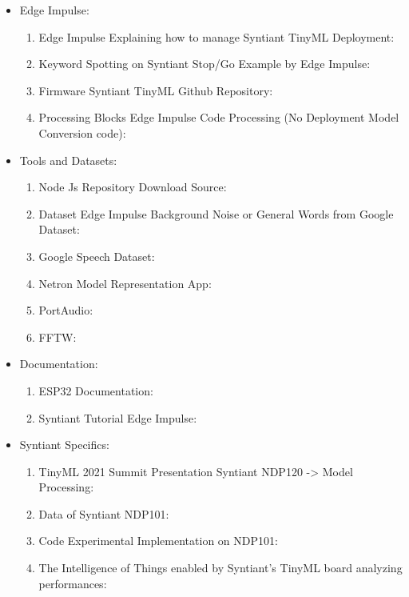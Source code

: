 \begin{itemize} 
\item Edge Impulse:
\begin{enumerate}
    \item Edge Impulse Explaining how to manage Syntiant TinyML Deployment: \cite{edgeimpulse_syntiant_tinyml}
    \item Keyword Spotting on Syntiant Stop/Go Example by Edge Impulse: \cite{edgeimpulse_kws_example}
    \item Firmware Syntiant TinyML Github Repository: \cite{edgeimpulse_firmware_syntiant}
    \item Processing Blocks Edge Impulse Code Processing (No Deployment Model Conversion code): \cite{edgeimpulse_processing_blocks}
\end{enumerate}
\item Tools and Datasets:
\begin{enumerate}
    \item Node Js Repository Download Source: \cite{nodejs_repository}
    \item Dataset Edge Impulse Background Noise or General Words from Google Dataset: \cite{edgeimpulse_dataset_499022}
    \item Google Speech Dataset: \cite{speechcommands}
    \item Netron Model Representation App: \cite{netron}
    \item PortAudio: \cite{portaudio}
    \item FFTW: \cite{FFTW}
\end{enumerate}
\item Documentation:
\begin{enumerate}
    \item ESP32 Documentation: \cite{esp32documentation}
    \item Syntiant Tutorial Edge Impulse: \cite{syntiant_tutorial_edgeimpulse}
\end{enumerate}
\item Syntiant Specifics:
\begin{enumerate}
    \item TinyML 2021 Summit Presentation Syntiant NDP120 -> Model Processing: \cite{tinyML_2021_summit}
    \item Data of Syntiant NDP101: \cite{experimental_try_on_ndp101}
    \item Code Experimental Implementation on NDP101: \cite{origin_code_1}
    \item The Intelligence of Things enabled by Syntiant's TinyML board analyzing performances: \cite{analysis_syntiant_performances}

\end{enumerate}
\end{itemize}
